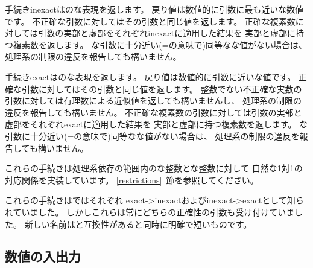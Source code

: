 \begin{entry}{%
}

手続き{\cf inexact}はのな表現を返します。
戻り値は数値的に引数に最も近いな数値です。
不正確な引数に対してはその引数と同じ値を返します。
正確な複素数に対しては引数の実部と虚部をそれぞれ{\cf inexact}に適用した結果を
実部と虚部に持つ複素数を返します。
な引数に十分近い({\cf =}の意味で)同等なな値がない場合は、
処理系の制限の違反を報告しても構いません。

手続き{\cf exact}はのな表現を返します。
戻り値は数値的に引数に近いな値です。
正確な引数に対してはその引数と同じ値を返します。
整数でない不正確な実数の引数に対しては有理数による近似値を返しても構いませんし、
処理系の制限の違反を報告しても構いません。
不正確な複素数の引数に対しては引数の実部と虚部をそれぞれ{\cf exact}に適用した結果を
実部と虚部に持つ複素数を返します。
な引数に十分近い({\cf =}の意味で)同等なな値がない場合は、
処理系の制限の違反を報告しても構いません。

これらの手続きは処理系依存の範囲内のな整数とな整数に対して
自然な1対1の対応関係を実装しています。
\ref{restrictions}~節を参照してください。

\begin{note}
これらの手続きは\rfivers{}ではそれぞれ
{\cf exact->inexact}および{\cf inexact->exact}として知られていました。
しかしこれらは常にどちらの正確性の引数も受け付けていました。
新しい名前は\rsixrs{}と互換性があると同時に明確で短いものです。
\end{note}

\end{entry}

\medskip

\subsection{数値の入出力}

